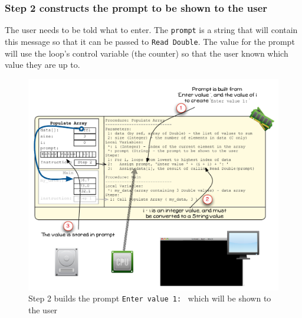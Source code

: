 
\clearpage
\subsubsection{Step 2 constructs the prompt to be shown to the user} %
\label{ssub:step_2_constructs_the_prompt_to_be_shown_to_the_user}

The user needs to be told what to enter. The \texttt{prompt} is a string that will contain this message so that it can be passed to \texttt{Read Double}. The value for the prompt will use the loop's control variable (the counter) so that the user known which value they are up to.

\begin{figure}[htbp]
   \centering
   \includegraphics[width=\textwidth]{./topics/arrays/images/PopulateArray4} 
   \caption{Step 2 builds the prompt \texttt{Enter value 1: } which will be shown to the user}
   \label{fig:populate-array-vis-4}
\end{figure}

